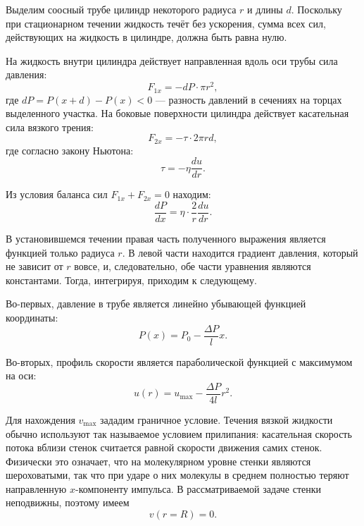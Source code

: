 \documentclass[a4paper,12pt]{article}
\begin{document}
    
    Выделим соосный трубе цилиндр некоторого радиуса $r$ и длины $d$. Поскольку при стационарном течении жидкость течёт без ускорения, сумма всех сил, действующих на жидкость в цилиндре, должна быть равна нулю.
    
    На жидкость внутри цилиндра действует направленная вдоль оси трубы сила давления:
    \begin{equation*}
    F_{1x} = -dP \cdot \pi r^2,
    \end{equation*}
    где $dP = P(x + d) - P(x) < 0$ — разность давлений в сечениях на торцах выделенного участка.
    \newpage
    На боковые поверхности цилиндра действует касательная сила вязкого трения:
    \begin{equation*}
    F_{2x} = -\tau \cdot 2\pi r d,
    \end{equation*}
    где согласно закону Ньютона:
    \begin{equation*}
    \tau = -\eta \frac{du}{dr}.
    \end{equation*}
    
    Из условия баланса сил $F_{1x} + F_{2x} = 0$ находим:
    \begin{equation*}
    \frac{dP}{dx} = \eta \cdot \frac{2}{r}  \frac{du}{dr}. 
    \end{equation*}
    
    В установившемся течении правая часть полученного выражения является функцией только радиуса $r$. В левой части находится градиент давления, который не зависит от $r$ вовсе, и, следовательно, обе части уравнения являются константами. Тогда, интегрируя, приходим к следующему.
    
    Во-первых, давление в трубе является линейно убывающей функцией координаты:
    \begin{equation*}
    P(x) = P_0 - \frac{\Delta P}{l} x. 
    \end{equation*}
    
    Во-вторых, профиль скорости является параболической функцией с максимумом на оси:
    \begin{equation*}
    u(r) = u_{\text{max}} - \frac{\Delta P}{4 l} r^2.
    \end{equation*}
    
    Для нахождения $v_{\text{max}}$ зададим граничное условие. Течения вязкой жидкости обычно используют так называемое условием прилипания: касательная скорость потока
    вблизи стенок считается равной скорости движения самих стенок. Физически
    это означает, что на молекулярном уровне стенки являются шероховатыми,
    так что при ударе о них молекулы в среднем полностью теряют направленную
    $x$-компоненту импульса. В рассматриваемой задаче стенки неподвижны, поэтому имеем
    \begin{equation*}
    v(r = R) = 0. 
    \end{equation*}
    
\end{document}
